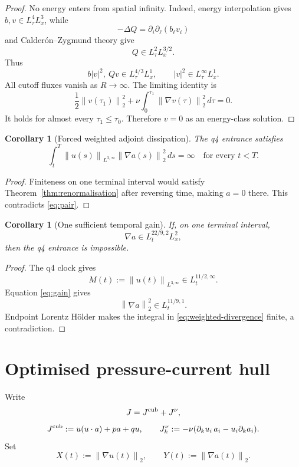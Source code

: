 \documentclass[11pt]{article}
\newtheorem{corollary}[theorem]{Corollary}
\theoremstyle{remark}
\newcommand{\norm}[1]{\left\|#1\right\|}
\begin{document}
\begin{proof}
No energy enters from spatial infinity.  Indeed, energy interpolation
gives \(b,v\in L^4_\tau L^3_x\), while
\[
 -\Delta Q=\partial_i\partial_\ell(b_\ell v_i)
\]
and Calder\'on--Zygmund theory give
\[
 Q\in L^2_\tau L^{3/2}_x.
\]
Thus
\[
 b|v|^2,\ Qv\in L^{4/3}_\tau L^1_x,
 \qquad
 |v|^2\in L^\infty_\tau L^1_x.
\]
All cutoff fluxes vanish as \(R\to\infty\).  The limiting identity is
\[
 \frac12\norm{v(\tau_1)}_2^2
 +\nu\int_0^{\tau_1}\norm{\nabla v(\tau)}_2^2\,d\tau
 =0.
\]
It holds for almost every \(\tau_1\leq\tau_0\).  Therefore \(v=0\)
as an energy-class solution.
\end{proof}

\begin{corollary}[Forced weighted adjoint dissipation]
\label{cor:weighted-divergence}
The q4 entrance satisfies
\begin{equation}
 \label{eq:weighted-divergence}
 \boxed{
 \int_t^T
 \norm{u(s)}_{L^{3,\infty}}
 \norm{\nabla a(s)}_2^2\,ds
 =\infty
 \quad\text{for every }t<T.
 }
\end{equation}
\end{corollary}

\begin{proof}
Finiteness on one terminal interval would satisfy
Theorem~\ref{thm:renormalisation} after reversing time, making
\(a=0\) there.  This contradicts \eqref{eq:pair}.
\end{proof}

\begin{corollary}[One sufficient temporal gain]
\label{cor:gain}
If, on one terminal interval,
\begin{equation}
 \label{eq:gain}
 \nabla a\in L_t^{22/9,2}L_x^2,
\end{equation}
then the q4 entrance is impossible.
\end{corollary}

\begin{proof}
The q4 clock gives
\[
 M(t):=\norm{u(t)}_{L^{3,\infty}}
 \in L_t^{11/2,\infty}.
\]
Equation \eqref{eq:gain} gives
\[
 \norm{\nabla a}_2^2\in L_t^{11/9,1}.
\]
Endpoint Lorentz H\"older makes the integral in
\eqref{eq:weighted-divergence} finite, a contradiction.
\end{proof}

\section{Optimised pressure-current hull}

Write
\[
 J=J^{\rm cub}+J^\nu,
\]
\[
 J^{\rm cub}:=u(u\cdot a)+pa+qu,
 \qquad
 J^\nu_k:=-\nu(\partial_ku_i\,a_i-u_i\partial_ka_i).
\]
Set
\[
 X(t):=\norm{\nabla u(t)}_2,\qquad
 Y(t):=\norm{\nabla a(t)}_2.
\]
\end{document}
